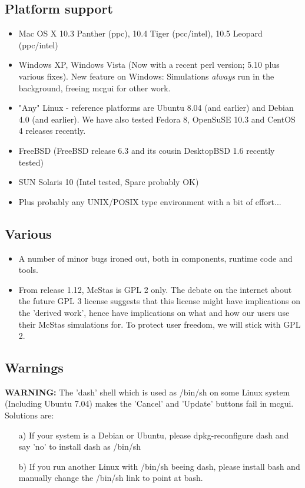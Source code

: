 \subsection{Platform support}
\begin{itemize}
\item Mac OS X 10.3 Panther (ppc), 10.4 Tiger (pcc/intel), 10.5 Leopard (ppc/intel)
\item Windows XP,  Windows Vista (Now with a recent perl version; 5.10 plus various fixes). New feature on Windows:
     Simulations \emph{always} run in the background, freeing mcgui for other work.
\item "Any" Linux - reference platforms are Ubuntu 8.04 (and earlier) and Debian 4.0 (and earlier). We have also tested 
  Fedora 8, OpenSuSE 10.3 and CentOS 4 releases recently.
\item FreeBSD (FreeBSD release 6.3 and its cousin DesktopBSD 1.6 recently tested)
\item SUN Solaris 10 (Intel tested, Sparc probably OK)
\item Plus probably any UNIX/POSIX type environment with a bit of effort...
\end{itemize}

\subsection{Various}
\begin{itemize}
\item  A number of minor bugs ironed out, both in components, runtime code and tools.
\item From release 1.12, McStas is GPL 2 only. The debate on the internet about the future GPL 3 license suggests that this license 
     might have implications on the 'derived work', hence have implications on what and how our users use their McStas simulations
     for. To protect user freedom, we will stick with GPL 2.     
\end{itemize}

\subsection{Warnings}
{\bf WARNING:} The 'dash' shell which is used as /bin/sh on some Linux system (Including Ubuntu 7.04) makes the 'Cancel' and 'Update' 
buttons fail in mcgui. Solutions are:
\begin{itemize}
\item[a)] If your system is a Debian or Ubuntu, please dpkg-reconfigure dash and say 'no' to install dash as /bin/sh
\item[b)] If you run another Linux with /bin/sh beeing dash, please install bash and manually change the /bin/sh link to point at bash.
\end{itemize}


